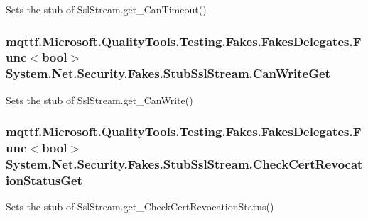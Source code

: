 Sets the stub of Ssl\-Stream.\-get\-\_\-\-Can\-Timeout()

\hypertarget{class_system_1_1_net_1_1_security_1_1_fakes_1_1_stub_ssl_stream_a1f51bc2235ad5afcf4dad2219e6a7893}{
\subsubsection[{Can\-Write\-Get}]{\setlength{\rightskip}{0pt plus 5cm}mqttf.\-Microsoft.\-Quality\-Tools.\-Testing.\-Fakes.\-Fakes\-Delegates.\-Func$<$bool$>$ System.\-Net.\-Security.\-Fakes.\-Stub\-Ssl\-Stream.\-Can\-Write\-Get}}\label{class_system_1_1_net_1_1_security_1_1_fakes_1_1_stub_ssl_stream_a1f51bc2235ad5afcf4dad2219e6a7893}


Sets the stub of Ssl\-Stream.\-get\-\_\-\-Can\-Write()

\hypertarget{class_system_1_1_net_1_1_security_1_1_fakes_1_1_stub_ssl_stream_a61c10b5ee2fd1026a791613bcc30bffd}{
\subsubsection[{Check\-Cert\-Revocation\-Status\-Get}]{\setlength{\rightskip}{0pt plus 5cm}mqttf.\-Microsoft.\-Quality\-Tools.\-Testing.\-Fakes.\-Fakes\-Delegates.\-Func$<$bool$>$ System.\-Net.\-Security.\-Fakes.\-Stub\-Ssl\-Stream.\-Check\-Cert\-Revocation\-Status\-Get}}\label{class_system_1_1_net_1_1_security_1_1_fakes_1_1_stub_ssl_stream_a61c10b5ee2fd1026a791613bcc30bffd}


Sets the stub of Ssl\-Stream.\-get\-\_\-\-Check\-Cert\-Revocation\-Status()

